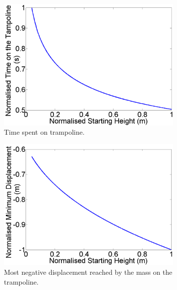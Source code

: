 \begin{figure}[H]
	\centering
    \begin{subfigure}[t]{0.3\textwidth}
		\includegraphics[width=\textwidth]{Norm_Time_StartHeight.png}
    	\caption{Time spent on trampoline.}\label{fig:Norm_Time_StartHeight}
    \end{subfigure}\hfill
	\begin{subfigure}[t]{0.3\textwidth}
		\includegraphics[width=\textwidth]{Norm_MinY_StartHeight.png}
    	\caption{Most negative displacement reached by the mass on the trampoline.}\label{fig:Norm_MinY_StartHeight}
    \end{subfigure}\hfill
    \begin{subfigure}[t]{0.3\textwidth}

\end{subfigure}
\end{figure}

